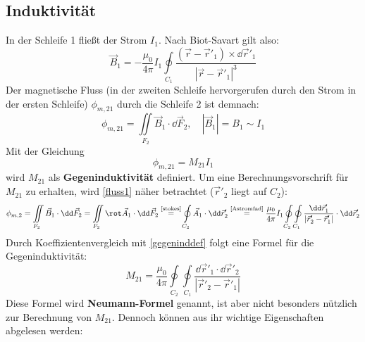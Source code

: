   \subsection{Induktivität}
	  \begin{center}
		  
	  \end{center}
		   In der Schleife 1 fließt der Strom \( I_1 \). Nach Biot-Savart gilt also:
		        \begin{equation}
			        \vec{B} _1 = -\dfrac{\mu_0}{4 \pi} I_1 \oint\limits_{C_1} \dfrac{\left( \vec{r}  - \vec{r}' _1 \right) \times \dd \vec{r}'_1}{\left| \vec{r}  - \vec{r}' _1 \right|^3}
		        \end{equation}
		   Der magnetische Fluss (in der zweiten Schleife hervorgerufen durch den Strom in der ersten Schleife) $\phi_{m,21}$ durch die Schleife 2 ist demnach:
		        \begin{equation}\label{fluss1}
			        \phi_{m,21} = \iint\limits_{F_2} \vec{B} _1 \cdot \dd\vec{F}_2, \quad \left| \vec{B} _1 \right| = B_1 \sim  I_1
		        \end{equation}
		   Mit der Gleichung 
		   \begin{equation} \label{gegeninddef}
		  \boxed{\phi_{m,21} = M_{21}  I_1}
	\end{equation} wird $ M_{21}$ als \textbf{Gegeninduktivität} definiert. Um eine Berechnungsvorschrift für $ M_{21}$ zu erhalten, wird \ref{fluss1} näher betrachtet  (\(\vec{r}' _2 \) liegt auf \(C_2 \)):
	  \begin{equation}
		  \phi_{m,2} = \iint\limits_{F_2} \vec{B} _1 \cdot \dd\vec{F}_2 = \iint\limits_{F_2} \rot  \vec{A}_1 \cdot \dd\vec{F}_2 \stackrel{\text{\ref{stokes}}}{=} \oint\limits_{C_2}  \vec{A}_1 \cdot \dd\vec{r}'_2 \stackrel{\text{\ref{Astromfad}}}{=} \dfrac{\mu_0}{4 \pi}   I_1 \oint\limits_{C_2} \oint\limits_{C_1} \dfrac{\dd  \vec{r}'_1}{\left| \vec{r}' _2 - \vec{r}' _1 \right|} \cdot \dd\vec{r}'_2
	  \end{equation}
		Durch Koeffizientenvergleich mit \ref{gegeninddef} folgt eine Formel für die Gegeninduktivität:
		        \begin{equation}
		        \boxed{ M_{21} = \dfrac{\mu_0}{4 \pi}  \oint\limits_{C_2} \oint\limits_{C_1} \dfrac{\dd  \vec{r}'_1 \cdot \dd \vec{r}'_2}{\left| \vec{r}' _2 - \vec{r}' _1 \right|} } 
		        \end{equation}
		   Diese Formel wird \textbf{Neumann-Formel} genannt, ist aber nicht besonders nützlich zur Berechnung von \( M_{21} \). Dennoch können aus ihr wichtige Eigenschaften abgelesen werden:
